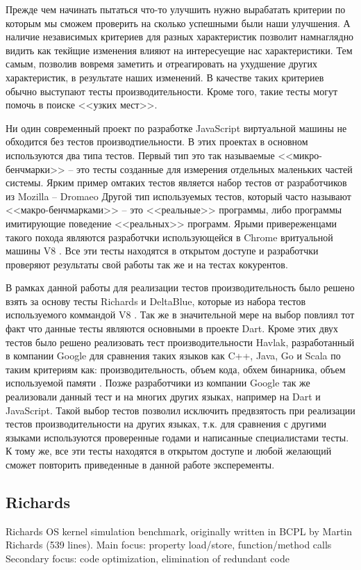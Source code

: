 Прежде чем начинать пытаться что-то улучшить нужно вырабатать критерии по которым мы сможем проверить на сколько успешными были наши улучшения. А наличие независимых критериев для разных характеристик позволит намнаглядно видить как текйщие изменения влияют на интересуещие нас характеристики. Тем самым, позволив вовремя заметить и отреагировать на ухудшение других характеристик, в результате наших изменений.
В качестве таких критериев обычно выступают тесты производительности. Кроме того, такие тесты могут помочь в поиске <<узких мест>>.

Ни один современный проект по разработке JavaScript виртуальной машины не обходится без тестов производтиельности. В этих проектах в основном используются два типа тестов. Первый тип это так называемые <<микро-бенчмарки>> -- это тесты созданные для измерения отдельных маленьких частей системы. Ярким пример омтаких тестов является набор тестов от разработчиков из Mozilla -- Dromaeo \cite{Dromaeo}  Другой тип используемых тестов, который часто называют <<макро-бенчмарками>> -- это <<реальные>> программы, либо программы имитирующие поведение <<реальных>> программ. Ярыми привереженцами такого похода являются разработчки использующейся в Chrome вритуальной машины V8 \cite{V8:Benchmarks, Octane}. Все эти тесты находятся в открытом доступе и разработчки проверяют результаты свой работы так же и на тестах кокурентов.

В рамках данной работы для реализации тестов производительность было решено взять за основу тесты Richards и DeltaBlue, которые из набора тестов используемого коммандой V8 \cite{V8:Benchmarks}. Так же в значительной мере на выбор повлиял тот факт что данные тесты являются основными в проекте Dart.
Кроме этих двух тестов было решено реализовать тест производительности Havlak, разработанный в компании Google для сравнения таких языков как C++, Java, Go и Scala по таким критериям как: производительность, объем кода, обхем бинарника, объем используемой памяти \cite{Havlak}. Позже разработчики из компании Google так же реализовали данный тест и на многих других языках, например на Dart и JavaScript.
Такой выбор тестов позволил исключить предвзятость при реализации тестов производительности на других языках, т.к. для сравнения с другими языками используются проверенные годами и написанные специалистами тесты. К тому же, все эти тесты находятся в открытом доступе и любой желающий сможет повторить приведенные в данной работе эксперементы.

\subsection{Richards}
Richards
OS kernel simulation benchmark, originally written in BCPL by Martin Richards (539 lines).
Main focus: property load/store, function/method calls
Secondary focus: code optimization, elimination of redundant code

